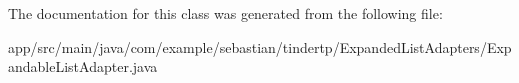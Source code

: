 The documentation for this class was generated from the following file\+:\begin{DoxyCompactItemize}
\item 
app/src/main/java/com/example/sebastian/tindertp/\+Expanded\+List\+Adapters/Expandable\+List\+Adapter.\+java\end{DoxyCompactItemize}
